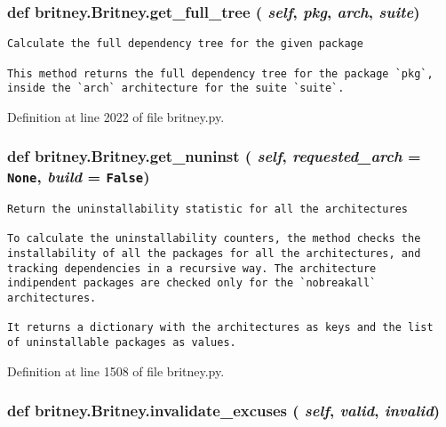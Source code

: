 \subsubsection{\setlength{\rightskip}{0pt plus 5cm}def britney.Britney.get\_\-full\_\-tree ( {\em self},  {\em pkg},  {\em arch},  {\em suite})}\label{classbritney_1_1Britney_a923f6b90e2574e3bb2bb099b05925dd}




\footnotesize\begin{verbatim}Calculate the full dependency tree for the given package

This method returns the full dependency tree for the package `pkg`,
inside the `arch` architecture for the suite `suite`.
\end{verbatim}
\normalsize
 

Definition at line 2022 of file britney.py.
\subsubsection{\setlength{\rightskip}{0pt plus 5cm}def britney.Britney.get\_\-nuninst ( {\em self},  {\em requested\_\-arch} = {\tt None},  {\em build} = {\tt False})}\label{classbritney_1_1Britney_41c5ee0b9d64b2e76a0c1a1c2b28c73e}




\footnotesize\begin{verbatim}Return the uninstallability statistic for all the architectures

To calculate the uninstallability counters, the method checks the
installability of all the packages for all the architectures, and
tracking dependencies in a recursive way. The architecture
indipendent packages are checked only for the `nobreakall`
architectures.

It returns a dictionary with the architectures as keys and the list
of uninstallable packages as values.
\end{verbatim}
\normalsize
 

Definition at line 1508 of file britney.py.
\subsubsection{\setlength{\rightskip}{0pt plus 5cm}def britney.Britney.invalidate\_\-excuses ( {\em self},  {\em valid},  {\em invalid})}\label{classbritney_1_1Britney_171969785db449d7a06c3f762774e0cd}




